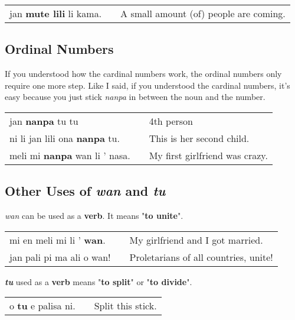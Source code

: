 \begin{supertabular}{p{5,5cm}|ll}
jan \textbf{mute lili} li kama. && A small amount (of) people are coming. \\
\end{supertabular} 
%
\subsection*{Ordinal Numbers}
%
If you understood how the cardinal numbers work, the ordinal numbers only require one more step. 
Like I said, if you understood the cardinal numbers, it's easy because you just stick \textit{nanpa} in between the noun and the number. 

\begin{supertabular}{p{5,5cm}|ll}
jan \textbf{nanpa} tu tu && 4th person \\
ni li jan lili ona \textbf{nanpa} tu. && This is her second child. \\
meli mi \textbf{nanpa} wan li ' nasa. && My first girlfriend was crazy. \\
\end{supertabular} 
%
\subsection*{Other Uses of \textit{wan} and \textit{tu}}
%
\textit{wan} can be used as a \textbf{verb}. 
It means "\textbf{to unite}". 

\begin{supertabular}{p{5,5cm}|ll}
mi en meli mi li ' \textbf{wan}. && My girlfriend and I got married. \\
jan pali pi ma ali o wan! && Proletarians of all countries, unite! \\

\end{supertabular} 

\textbf{\textit{tu}} used as a \textbf{verb} means "\textbf{to split}" or "\textbf{to divide}". 

\begin{supertabular}{p{5,5cm}|ll}
o \textbf{tu} e palisa ni. && Split this stick.  \\
\end{supertabular} 

